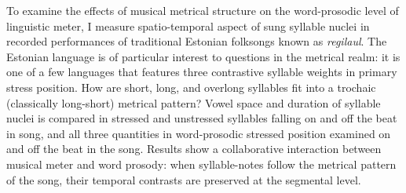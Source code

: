 \documentclass[12pt]{report}	%
\theoremstyle{plain} %
\theoremstyle{definition}
\theoremstyle{remark}
\numberwithin{equation}{section}
\begin{document}
%
\utabstract
{}%
\indent
%
%
To examine the effects of musical metrical structure on the word-prosodic level of linguistic meter, I measure spatio-temporal aspect of sung syllable nuclei in recorded performances of traditional Estonian folksongs known as {\it regilaul}. The Estonian language is of particular interest to questions in the metrical realm: it is one of a few languages that features three contrastive syllable weights in primary stress position. How are short, long, and overlong syllables fit into a trochaic (classically long-short) metrical pattern? 
 Vowel space and duration of syllable nuclei is compared in stressed and unstressed syllables falling on and off the beat in song, and all three quantities in word-prosodic stressed position examined on and off the beat in the song. Results show a collaborative interaction between musical meter and word prosody: when syllable-notes follow the metrical pattern of the song, their temporal contrasts are preserved at the segmental level. 

 \tableofcontents   %

\listoftables      %
\listoffigures     %



%


%







%
%
%
%

%
\end{document}
